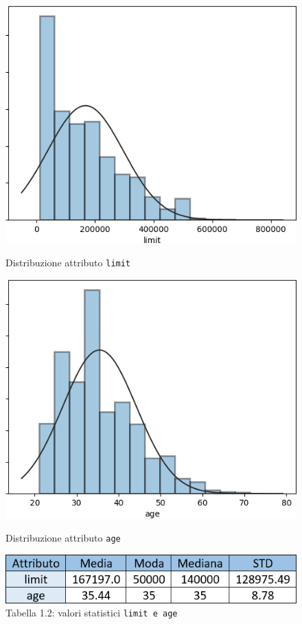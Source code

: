 \begin{figure}[!htb]
  \includegraphics[width=\linewidth]{img/limit-distribution.png}
  \caption{Distribuzione attributo \texttt{limit}}\label{limit-dist}
\endminipage\hfill
{}
  \includegraphics[width=\linewidth]{img/age-distribution.png}
 \caption{Distribuzione attributo \texttt{age}}\label{age-dist}
\endminipage\hfill
{}
  \includegraphics[width=\linewidth]{img/limit-age-stat.png}
\captionsetup{labelformat=empty}
\caption{Tabella 1.2: valori statistici \texttt{limit e age}}
	\label{limit-age-stat}
\endminipage
\end{figure}

